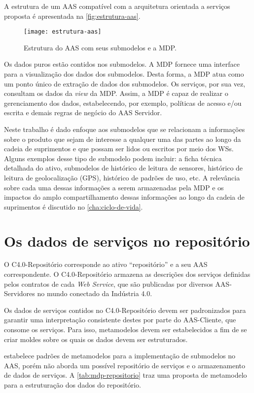 	A estrutura de um AAS compatível com a arquitetura orientada a serviços proposta é apresentada na \autoref{fig:estrutura-aas}.
	
	\begin{figure}[htb]
		\centering
		\label{fig:estrutura-aas}
		\texttt{[image: estrutura-aas]}
		\caption{Estrutura do AAS com seus submodelos e a MDP.}
	\end{figure}

	Os dados puros estão contidos nos submodelos. A MDP fornece uma interface para a visualização dos dados dos submodelos. Desta forma, a MDP atua como um ponto único de extração de dados dos submodelos. Os serviços, por sua vez, consultam os dados da \textit{view} da MDP. Assim, a MDP é capaz de realizar o gerenciamento dos dados, estabelecendo, por exemplo, políticas de acesso e/ou escrita e demais regras de negócio do AAS Servidor.
	
	Neste trabalho é dado enfoque aos submodelos que se relacionam a informações sobre o produto que sejam de interesse a qualquer uma das partes ao longo da cadeia de suprimentos e que possam ser lidos ou escritos por meio dos WSs. Alguns exemplos desse tipo de submodelo podem incluir: a ficha técnica detalhada do ativo, submodelos de histórico de leitura de sensores, histórico de leitura de geolocalização (GPS), histórico de padrões de uso, etc. A relevância sobre cada uma dessas informações a serem armazenadas pela MDP e os impactos do amplo compartilhamento dessas informações ao longo da cadeia de suprimentos é discutido no \autoref{cha:ciclo-de-vida}.

\section{Os dados de serviços no repositório}
	
	O C4.0-Repositório corresponde ao ativo ``repositório'' e a seu AAS correspondente. O C4.0-Repositório armazena as descrições dos serviços definidas pelos contratos de cada \textit{Web Service}, que são publicadas por diversos AAS-Servidores no mundo conectado da Indústria 4.0.
	
	Os dados de serviços contidos no C4.0-Repositório devem ser padronizados para garantir uma interpretação consistente destes por parte do AAS-Cliente, que consome os serviços. Para isso, metamodelos devem ser estabelecidos a fim de se criar moldes sobre os quais os dados devem ser estruturados.
	
	 estabelece padrões de metamodelos para a implementação de submodelos no AAS, porém não aborda um possível repositório de serviços e o armazenamento de dados de serviços. A \autoref{tab:mdp-repositorio} traz uma proposta de metamodelo para a estruturação dos dados do repositório.
	
